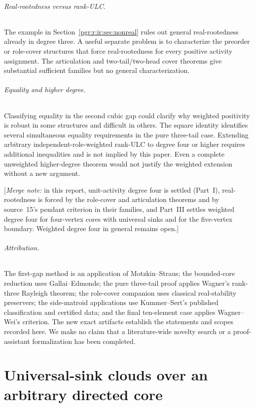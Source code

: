 \documentclass[11pt]{article}
\numberwithin{equation}{section}
\theoremstyle{definition}\newtheorem{definition}[theorem]{Definition}\newtheorem{remark}[theorem]{Remark}
\newcommand{\mnote}[1]{[\textit{Merge note:} #1]}
\begin{document}
\paragraph{Real-rootedness versus rank-ULC.}
The example in Section~\ref{pgr:r:ir:sec:nonreal} rules out general real-rootedness already in degree three. A useful separate problem is to characterize the preorder or role-cover structures that force real-rootedness for every positive activity assignment. The articulation and two-tail/two-head cover theorems give substantial sufficient families but no general characterization.

\paragraph{Equality and higher degree.}
Classifying equality in the second cubic gap could clarify why weighted positivity is robust in some structures and difficult in others. The square identity identifies several simultaneous equality requirements in the pure three-tail case. Extending arbitrary independent-role-weighted rank-ULC to degree four or higher requires additional inequalities and is not implied by this paper. Even a complete unweighted higher-degree theorem would not justify the weighted extension without a new argument.


\mnote{in this report, unit-activity degree four is settled (Part~I),
real-rootedness is forced by the role-cover and articulation theorems and
by source~15's pendant criterion in their families, and Part~III settles
weighted degree four for four-vertex cores with universal sinks and for
the five-vertex boundary. Weighted degree four in general remains open.}

\paragraph{Attribution.}
The first-gap method is an application of Motzkin--Straus; the bounded-core reduction uses Gallai--Edmonds; the pure three-tail proof applies Wagner's rank-three Rayleigh theorem; the role-cover companion uses classical real-stability preservers; the side-matroid applications use Kummer--Sert's published classification and certified data; and the final ten-element case applies Wagner--Wei's criterion. The new exact artifacts establish the statements and scopes recorded here. We make no claim that a literature-wide novelty search or a proof-assistant formalization has been completed.


\part{Universal-sink clouds over an arbitrary directed core}\label{pgr:part:three}
\end{document}
